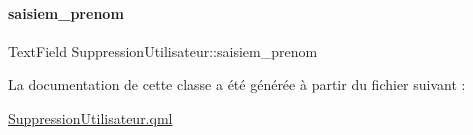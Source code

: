 \mbox{\label{class_suppression_utilisateur_a9d1a9abc86c8dee5c3d08644c28c8408}} 
\paragraph{\texorpdfstring{saisiem\+\_\+prenom}{saisiem\_prenom}}
{\footnotesize\ttfamily Text\+Field Suppression\+Utilisateur\+::saisiem\+\_\+prenom\hspace{0.3cm}{\ttfamily [private]}}



La documentation de cette classe a été générée à partir du fichier suivant \+:\begin{DoxyCompactItemize}
\item 
\hyperlink{_suppression_utilisateur_8qml}{Suppression\+Utilisateur.\+qml}\end{DoxyCompactItemize}
